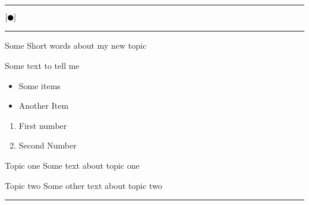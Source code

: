 \documentclass[landscape]{article}
\title{}
\author{}
\newcommand{\myline}{\vspace{4pt}\hrule  \vspace{4pt}}
\newcommand{\legalblob}{\ensuremath{ \left[ \newmoon \right] } \xspace}
\newenvironment{topic}[1]{
	\noindent \textbf{\textsc{\color{harvardcrimson}{#1}}}
	\noindent \hspace{-3.5pt}
}{
	\myline
}
\newenvironment{tellme}[1]{
	\noindent \textbf{\textit{\color{harvardblue}{#1}}}
	\begin{adjustwidth}{9pt}{}
	}{
	\end{adjustwidth}
}
\newenvironment{compactitem}{
	\begin{itemize}[leftmargin=*,labelsep=5pt]
	}{
	\end{itemize}
}
\newenvironment{compactenum}{
	\begin{enumerate}[leftmargin=*,labelsep=5pt]
	}{
	\end{enumerate}
}
\newenvironment{compactdesc}{
	\begin{description}[leftmargin=1em,labelsep=0.7em, font=\normalfont\itshape]
	}{
	\end{description}
}
\begin{document}
	\footnotesize

	\begin{multicols*}{3}
	\hfill
	\vspace{-1\baselineskip}
	\hfill
	
	\myline
	\vspace{-0.2cm}
	\begin{center}
		\LARGE \textsc{\legalblob} 
	\end{center}
	\vspace{-0.2cm}
	\myline 
	
	\begin{topic}{A New Topic} 
		Some Short words about my new topic
		
		\begin{tellme}{This is the first tell me block}
			Some text to tell me
			\begin{compactitem}
				\item Some items
				\item Another Item
			\end{compactitem}
			\begin{compactenum}
				\item First number
				\item Second Number
			\end{compactenum}
			\begin{compactdesc}
				\item[Topic one] Some text about topic one
				\item[Topic two] Some other text about topic two
			\end{compactdesc}
		\end{tellme}
	\end{topic}
	

		

\end{multicols*}
\end{document}
